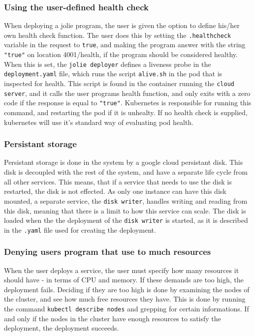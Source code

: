 \documentclass[Report.tex]{subfiles}
\begin{document}
\subsubsection{Using the user-defined health check}
When deploying a jolie program, the user is given the option to define his/her own health check function. The user does this by setting the {\tt .healthcheck} variable in the request to {\tt true}, and making the program answer with the string {\tt "true"} on location 4001/health, if the program should be considered healthy. When this is set, the {\tt jolie deployer} defines a liveness probe in the {\tt deployment.yaml} file, which runs the script {\tt alive.sh} in the pod that is inspected for health. This script is found in the container running the {\tt cloud server}, and it calls the user programs health function, and only exits with a zero code if the response is equal to {\tt "true"}. Kubernetes is responsible for running this command, and restarting the pod if it is unhealty. If no health check is supplied, kubernetes will use it's standard way of evaluating pod health.

\subsubsection{Persistant storage}
Persistant storage is done in the system by a google cloud persistant disk. This disk is decoupled with the rest of the system, and have a separate life cycle from all other services. This means, that if a service that needs to use the disk is restarted, the disk is not effected. As only one instance can have this disk mounted, a separate service, the {\tt disk writer}, handles writing and reading from this disk, meaning that there is a limit to how this service can scale. The disk is loaded when the the deployment of the {\tt disk writer} is started, as it is described in the {\tt .yaml} file used for creating the deployment.

\subsubsection{Denying users program that use to much resources}
When the user deploys a service, the user must specify how many resources it should have - in terms of CPU and memory. If these demands are too high, the deployment fails. Deciding if they are too high is done by examining the nodes of the cluster, and see how much free resources they have. This is done by running the command {\tt kubectl describe nodes} and grepping for certain informations. If and only if the nodes in the cluster have enough resources to satisfy the deployment, the deployment succeeds.
\end{document}
